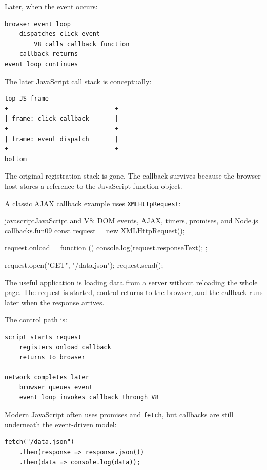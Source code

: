 \documentclass[a4paper,twoside]{report}
\begin{document}
Later, when the event occurs:

\begin{verbatim}
browser event loop
    dispatches click event
        V8 calls callback function
    callback returns
event loop continues
\end{verbatim}

The later JavaScript call stack is conceptually:

\begin{verbatim}
top JS frame
+-----------------------------+
| frame: click callback       |
+-----------------------------+
| frame: event dispatch       |
+-----------------------------+
bottom
\end{verbatim}

The original registration stack is gone. The callback survives because the browser host stores a reference to the JavaScript function object.

A classic AJAX callback example uses \texttt{XMLHttpRequest}:

\begin{codebox}[]{javascript}{JavaScript and V8: DOM events, AJAX, timers, promises, and Node.js callbacks.}{fun09}
const request = new XMLHttpRequest();

request.onload = function () {
    console.log(request.responseText);
};

request.open("GET", "/data.json");
request.send();
\end{codebox}


The useful application is loading data from a server without reloading the whole page. The request is started, control returns to the browser, and the callback runs later when the response arrives.

The control path is:

\begin{verbatim}
script starts request
    registers onload callback
    returns to browser

network completes later
    browser queues event
    event loop invokes callback through V8
\end{verbatim}

Modern JavaScript often uses promises and \texttt{fetch}, but callbacks are still underneath the event-driven model:

\begin{verbatim}
fetch("/data.json")
    .then(response => response.json())
    .then(data => console.log(data));
\end{verbatim}
\end{document}
